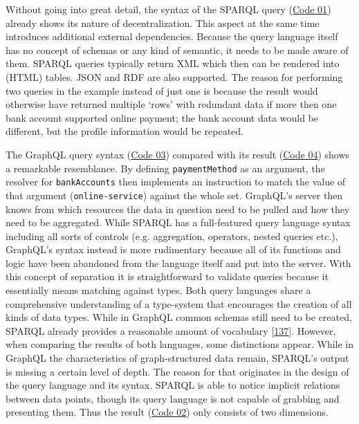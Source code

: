\documentclass[12pt,english,a4paper,titlepage,cleardoublepage=empty,dottedtoc]{report}
\begin{document}
Without going into great detail, the syntax of the SPARQL query
(\protect\hyperlink{code-01_sparql-query}{Code 01}) already shows its
nature of decentralization. This aspect at the same time introduces
additional external dependencies. Because the query language itself has
no concept of schemas or any kind of semantic, it needs to be made aware
of them. SPARQL queries typically return XML which then can be rendered
into (HTML) tables. JSON and RDF are also supported. The reason for
performing two queries in the example instead of just one is because the
result would otherwise have returned multiple `rows' with redundant data
if more then one bank account supported online payment; the bank account
data would be different, but the profile information would be repeated.

The GraphQL query syntax (\protect\hyperlink{code-03_graphql-query}{Code
03}) compared with its result
(\protect\hyperlink{code-04_graphql-query-result}{Code 04}) shows a
remarkable resemblance. By defining \texttt{paymentMethod} as an
argument, the resolver for \texttt{bankAccounts} then implements an
instruction to match the value of that argument
(\texttt{\textquotesingle{}online-service\textquotesingle{}}) against
the whole set. GraphQL's server then knows from which resources the data
in question need to be pulled and how they need to be aggregated. While
SPARQL has a full-featured query language syntax including all sorts of
controls (e.g. aggregation, operators, nested queries etc.), GraphQL's
syntax instead is more rudimentary because all of its functions and
logic have been abandoned from the language itself and put into the
server. With this concept of separation it is straightforward to
validate queries because it essentially means matching against types.
Both query languages share a comprehensive understanding of a
type-system that encourages the creation of all kinds of data types.
While in GraphQL common schemas still need to be created, SPARQL already
provides a reasonable amount of vocabulary
{[}\protect\hyperlink{ref-web_w3c-tr_rdf-schemas}{137}{]}. However, when
comparing the results of both languages, some distinctions appear. While
in GraphQL the characteristics of graph-structured data remain, SPARQL's
output is missing a certain level of depth. The reason for that
originates in the design of the query language and its syntax. SPARQL is
able to notice implicit relations between data points, though its query
language is not capable of grabbing and presenting them. Thus the result
(\protect\hyperlink{code-02_sparql-query-results}{Code 02}) only
consists of two dimensions.
\end{document}
